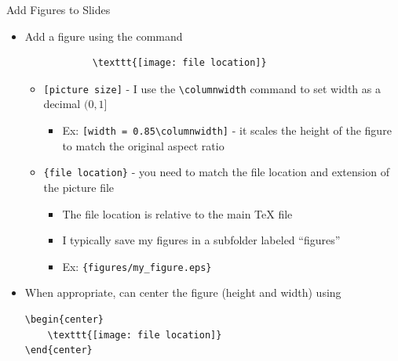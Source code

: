 \begin{frame}[fragile,t]{Add Figures to Slides}
	\begin{itemize}
		\item Add a figure using the command
		\begin{verbatim}
			\texttt{[image: file location]}
		\end{verbatim}
		\begin{itemize}
			\item \verb|[picture size]| - I use the \verb|\columnwidth| command to set width as a decimal $(0,1]$
			\begin{itemize}
				\item Ex: \verb|[width = 0.85\columnwidth]| - it scales the height of the figure to match the original aspect ratio
			\end{itemize}
			\item \verb|{file location}| - you need to match the file location and extension of the picture file
			\begin{itemize}
				\item The file location is relative to the main TeX file
				\item I typically save my figures in a subfolder labeled ``figures''
				\item Ex: \verb|{figures/my_figure.eps}|
			\end{itemize}
		\end{itemize}
		\item When appropriate, can center the figure (height and width) using
		{\small
		\begin{lstlisting}
\begin{center}
	\texttt{[image: file location]}
\end{center}
		\end{lstlisting}
		}
	\end{itemize}
\end{frame}

